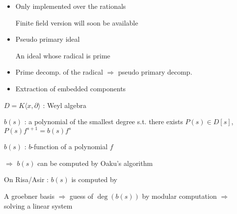 \begin{slide}{}

\begin{itemize}
\item Only implemented over the rationals

Finite field version will soon be available

\item Pseudo primary ideal

An ideal whose radical is prime

\item Prime decomp. of the radical $\Rightarrow$ pseudo primary decomp.

\item Extraction of embedded components

\end{itemize}

\end{slide}

\begin{slide}{}

$D=K\langle x,\partial \rangle$ : Weyl algebra

$b(s)$ : a polynomial of the smallest degree s.t.
there exists $P(s) \in D[s]$, $P(s)f^{s+1}=b(s)f^s$

$b(s)$ : $b$-function of a polynomial $f$

$\Rightarrow$ $b(s)$ can be computed by Oaku's algorithm

On Risa/Asir : $b(s)$ is computed by

A groebner basis $\Rightarrow$ guess of $\deg(b(s))$ by modular
computation $\Rightarrow$ solving a linear system
\end{slide}


